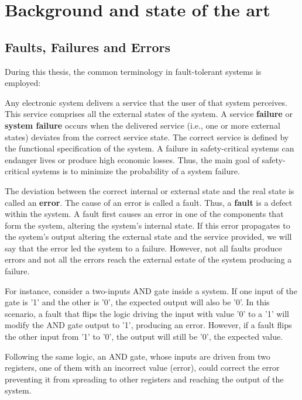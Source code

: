 \clearpage
\newpage
\section{Background and state of the art}

\subsection{Faults, Failures and Errors}

During this thesis, the common terminology in fault-tolerant systems \cite{AlgirdasAvizienis2004} is employed:

Any electronic system delivers a service that the user of that system perceives. This service comprises all the external states of the system. A service \textbf{failure} or \textbf{system failure} occurs when the delivered service (i.e., one or more external states) deviates from the correct service state. The correct service is defined by the functional specification of the system. A failure in safety-critical systems can endanger lives or produce high economic losses. Thus, the main goal of safety-critical systems is to minimize the probability of a system failure.

The deviation between the correct internal or external state and the real state is called an \textbf{error}. The cause of an error is called a fault. Thus, a \textbf{fault} is a defect within the system. A fault first causes an error in one of the components that form the system, altering the system's internal state. If this error propagates to the system's output altering the external state and the service provided, we will say that the error led the system to a failure. However, not all faults produce errors and not all the errors reach the external estate of the system producing a failure.  

For instance, consider a two-inputs AND gate inside a system. If one input of the gate is '1' and the other is '0', the expected output will also be '0'. In this scenario, a fault that flips the logic driving the input with value '0' to a '1' will modify the AND gate output to '1', producing an error. However, if a fault flips the other input from '1' to '0', the output will still be '0', the expected value. 

Following the same logic, an AND gate, whose inputs are driven from two registers, one of them with an incorrect value (error), could correct the error preventing it from spreading to other registers and reaching the output of the system.

